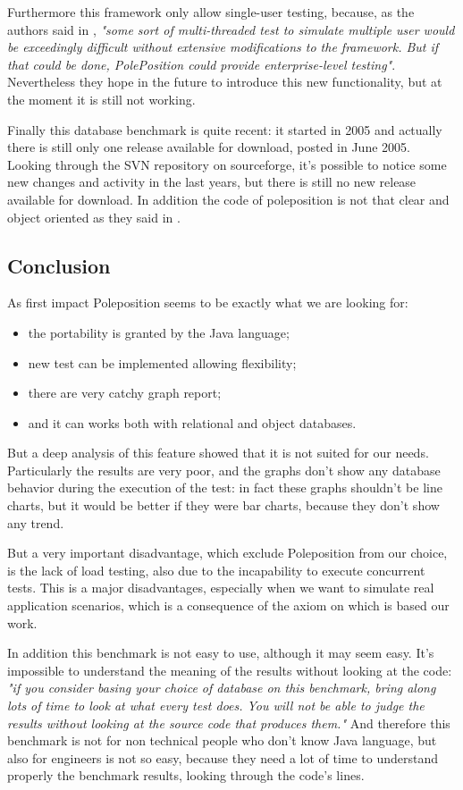 Furthermore this framework only allow single-user testing, because, as the authors said in \cite{poleposition}, \emph{"some sort of multi-threaded test to simulate multiple user would be exceedingly difficult without extensive modifications to the framework. But if that could be done, PolePosition could provide enterprise-level testing"}. Nevertheless they hope in the future to introduce this new functionality, but at the moment it is still not working.

Finally this database benchmark is quite recent: it started in 2005 and actually there is still only one release available for download, posted in June 2005. Looking through the SVN repository on sourceforge, it's possible to notice some new changes and activity in the last years, but there is still no new release available for download. In addition the code of poleposition is not that clear and object oriented as they said in \cite{poleposition}.

		\subsection{Conclusion}
As first impact Poleposition seems to be exactly what we are looking for:
\begin{itemize}
	\item the portability is granted by the Java language;
	\item new test can be implemented allowing flexibility;
	\item there are very catchy graph report;
	\item and it can works both with relational and object databases.
\end{itemize}
But a deep analysis of this feature showed that it is not suited for our needs. Particularly the results are very poor, and the graphs don't show any database behavior during the execution of the test: in fact these graphs shouldn't be line charts, but it would be better if they were bar charts, because they don't show any trend.

But a very important disadvantage, which exclude Poleposition from our choice, is the lack of load testing, also due to the incapability to execute concurrent tests. This is a major disadvantages, especially when we want to simulate real application scenarios, which is a consequence of the axiom on which is based our work. 

In addition this benchmark is not easy to use, although it may seem easy. It's impossible to understand the meaning of the results without looking at the code: \emph{"if you consider basing your choice of database on this benchmark, bring along lots of time to look at what every test does. You will not be able to judge the results without looking at the source code that produces them."} And therefore this benchmark is not for non technical people who don't know Java language, but also for engineers is not so easy, because they need a lot of time to understand properly the benchmark results, looking through the code's lines.

